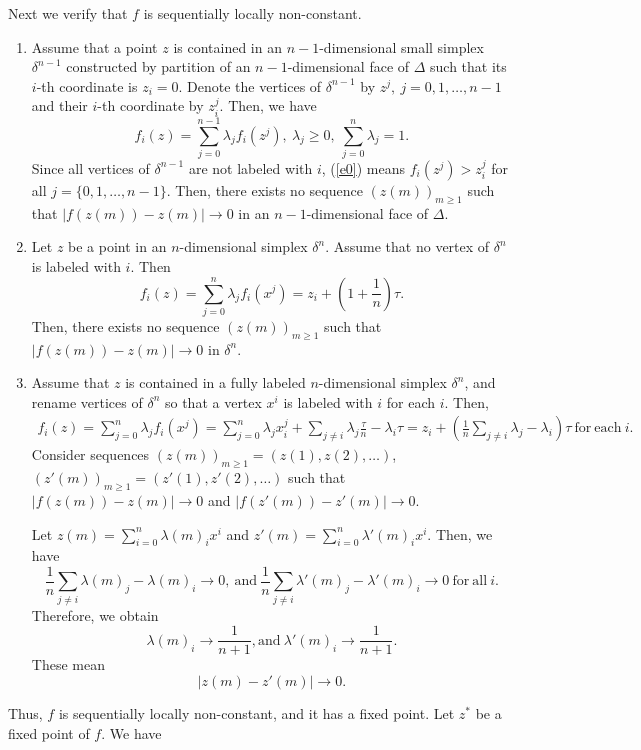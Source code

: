 \documentclass[reqno]{amsart}
\begin{document}
Next we verify that $f$ is sequentially locally non-constant.
\begin{enumerate}
	\item Assume that a point $z$ is contained in an $n-1$-dimensional small simplex $\delta^{n-1}$ constructed by partition of an $n-1$-dimensional face of $\Delta$ such that its $i$-th coordinate is $z_i=0$. Denote the vertices of $\delta^{n-1}$ by $z^j,\ j=0, 1, \dots, n-1$ and their $i$-th coordinate by $z_i^j$. Then, we have
\[f_i(z)=\sum_{j=0}^{n-1}\lambda_jf_i(z^j),\ \lambda_j\geq 0,\ \sum_{j=0}^n\lambda_j=1.\]
Since all vertices of $\delta^{n-1}$ are not labeled with $i$, (\ref{e0}) means $f_i(z^j)>z^j_i$ for all $j=\{0, 1, \dots, n-1\}$. Then, there exists no sequence $(z(m))_{m\geq 1}$ such that $|f(z(m))-z(m)|\longrightarrow 0$ in an $n-1$-dimensional face of $\Delta$.
\item Let $z$ be a point in an $n$-dimensional simplex $\delta^n$. Assume that no vertex of $\delta^n$ is labeled with $i$. Then
\begin{equation}
f_i(z)=\sum_{j=0}^n\lambda_jf_i(x^j)=z_i+\left(1+\frac{1}{n}\right)\tau.\label{e8}
\end{equation}
Then, there exists no sequence $(z(m))_{m\geq 1}$ such that $|f(z(m))-z(m)|\longrightarrow 0$ in $\delta^n$.
\item Assume that $z$ is contained in a fully labeled $n$-dimensional simplex $\delta^n$, and rename vertices of $\delta^n$ so that a vertex $x^i$ is labeled with $i$ for each $i$. Then,
\begin{align*}
f_i(z)=\sum_{j=0}^n\lambda_jf_i(x^j)=\sum_{j=0}^n\lambda_jx_i^j+\sum_{j\neq i}\lambda_j\frac{\tau}{n}-\lambda_i\tau=z_i+\left(\frac{1}{n}\sum_{j\neq i}\lambda_j-\lambda_i\right)\tau\ \mathrm{for\ each}\ i.
\end{align*}
Consider sequences $(z(m))_{m\geq 1}=(z(1), z(2), \dots)$, $(z'(m))_{m\geq 1}=(z'(1), z'(2), \dots)$ such that $|f(z(m))-z(m)|\longrightarrow 0$ and $|f(z'(m))-z'(m)|\longrightarrow 0$.

Let $z(m)=\sum_{i=0}^n\lambda(m)_ix^i$ and $z'(m)=\sum_{i=0}^n\lambda'(m)_ix^i$. Then, we have
\[\frac{1}{n}\sum_{j\neq i}\lambda(m)_j-\lambda(m)_i\longrightarrow 0,\ \mathrm{and}\ \frac{1}{n}\sum_{j\neq i}\lambda'(m)_j-\lambda'(m)_i\longrightarrow 0\ \mathrm{for\ all}\ i.\]
Therefore, we obtain
\[\lambda(m)_i\longrightarrow \frac{1}{n+1}, \mathrm{and}\ \lambda'(m)_i\longrightarrow \frac{1}{n+1}.\]
These mean
\[|z(m)-z'(m)|\longrightarrow 0.\]
\end{enumerate}
Thus, $f$ is sequentially locally non-constant, and it has a fixed point. Let $z^*$ be a fixed point of $f$. We have
\end{document}
